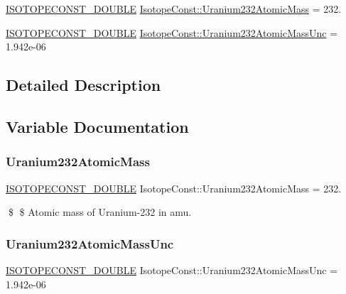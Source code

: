 \begin{DoxyCompactItemize}
\item 
\mbox{\hyperlink{group___isotope_const-_macros_ga8f45a7272ce02c0b4c65c44636ed719a}{I\+S\+O\+T\+O\+P\+E\+C\+O\+N\+S\+T\+\_\+\+D\+O\+U\+B\+LE}} \mbox{\hyperlink{group___isotope_const-_uranium-_u232_ga048b1a4ad6820b3a6350422441db613e}{Isotope\+Const\+::\+Uranium232\+Atomic\+Mass}} = 232.
\item 
\mbox{\hyperlink{group___isotope_const-_macros_ga8f45a7272ce02c0b4c65c44636ed719a}{I\+S\+O\+T\+O\+P\+E\+C\+O\+N\+S\+T\+\_\+\+D\+O\+U\+B\+LE}} \mbox{\hyperlink{group___isotope_const-_uranium-_u232_gadbf78686c3087677e82941bc5ddc2fc2}{Isotope\+Const\+::\+Uranium232\+Atomic\+Mass\+Unc}} = 1.\+942e-\/06
\end{DoxyCompactItemize}


\subsection{Detailed Description}


\subsection{Variable Documentation}
\mbox{\label{group___isotope_const-_uranium-_u232_ga048b1a4ad6820b3a6350422441db613e}} 
\subsubsection{\texorpdfstring{Uranium232\+Atomic\+Mass}{Uranium232AtomicMass}}
{\footnotesize\ttfamily \mbox{\hyperlink{group___isotope_const-_macros_ga8f45a7272ce02c0b4c65c44636ed719a}{I\+S\+O\+T\+O\+P\+E\+C\+O\+N\+S\+T\+\_\+\+D\+O\+U\+B\+LE}} Isotope\+Const\+::\+Uranium232\+Atomic\+Mass = 232.}

\$ \$ Atomic mass of Uranium-\/232 in amu. \mbox{\label{group___isotope_const-_uranium-_u232_gadbf78686c3087677e82941bc5ddc2fc2}} 
\subsubsection{\texorpdfstring{Uranium232\+Atomic\+Mass\+Unc}{Uranium232AtomicMassUnc}}
{\footnotesize\ttfamily \mbox{\hyperlink{group___isotope_const-_macros_ga8f45a7272ce02c0b4c65c44636ed719a}{I\+S\+O\+T\+O\+P\+E\+C\+O\+N\+S\+T\+\_\+\+D\+O\+U\+B\+LE}} Isotope\+Const\+::\+Uranium232\+Atomic\+Mass\+Unc = 1.\+942e-\/06}

